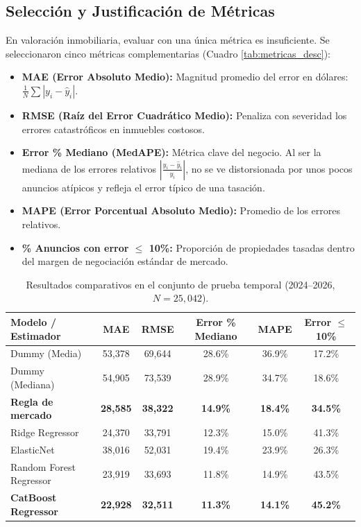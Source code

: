 \documentclass[11pt,a4paper]{article}
\begin{document}
\subsection{Selección y Justificación de Métricas}
En valoración inmobiliaria, evaluar con una única métrica es insuficiente. Se seleccionaron cinco métricas complementarias (Cuadro \ref{tab:metricas_desc}):
\begin{itemize}[leftmargin=1.5cm]
    \item \textbf{MAE (Error Absoluto Medio):} Magnitud promedio del error en dólares: $\frac{1}{N}\sum |y_i - \widehat{y}_i|$.
    \item \textbf{RMSE (Raíz del Error Cuadrático Medio):} Penaliza con severidad los errores catastróficos en inmuebles costosos.
    \item \textbf{Error \% Mediano (MedAPE):} Métrica clave del negocio. Al ser la mediana de los errores relativos $|\frac{y_i - \widehat{y}_i}{y_i}|$, no se ve distorsionada por unos pocos anuncios atípicos y refleja el error típico de una tasación.
    \item \textbf{MAPE (Error Porcentual Absoluto Medio):} Promedio de los errores relativos.
    \item \textbf{\% Anuncios con error $\le$ 10\%:} Proporción de propiedades tasadas dentro del margen de negociación estándar de mercado.
\end{itemize}

\begin{table}[H]
\centering
\small
\caption{Resultados comparativos en el conjunto de prueba temporal (2024--2026, $N = 25,042$).}
\label{tab:resultados_comparativos}
\begin{tabularx}{\textwidth}{lccccc}
\toprule
\textbf{Modelo / Estimador} & \textbf{MAE} & \textbf{RMSE} & \textbf{Error \% Mediano} & \textbf{MAPE} & \textbf{Error $\le$ 10\%} \\
\midrule
Dummy (Media) & 53,378 & 69,644 & 28.6\% & 36.9\% & 17.2\% \\
Dummy (Mediana) & 54,905 & 73,539 & 28.9\% & 34.7\% & 18.6\% \\
\textbf{Regla de mercado} & \textbf{28,585} & \textbf{38,322} & \textbf{14.9\%} & \textbf{18.4\%} & \textbf{34.5\%} \\
\midrule
Ridge Regressor & 24,370 & 33,791 & 12.3\% & 15.0\% & 41.3\% \\
ElasticNet & 38,016 & 52,031 & 19.4\% & 23.9\% & 26.3\% \\
Random Forest Regressor & 23,919 & 33,693 & 11.8\% & 14.9\% & 43.5\% \\
\textbf{CatBoost Regressor} & \textbf{22,928} & \textbf{32,511} & \textbf{11.3\%} & \textbf{14.1\%} & \textbf{45.2\%} \\
\bottomrule
\end{tabularx}
\end{table}
\end{document}
